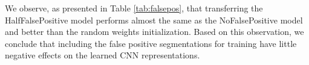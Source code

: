 We observe, as presented in Table \ref{tab:falsepos}, that transferring the HalfFalsePositive model performs almost the same as the NoFalsePositive model and better than the random weights initialization.
Based on this observation, we conclude that including the false positive segmentations for training have little negative effects on the learned CNN representations.


%
%
